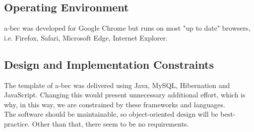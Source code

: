 \subsection{Operating Environment}
	a-bec was developed for Google Chrome but runs on most "up to date" browsers, i.e. Firefox, Safari, Microsoft Edge, Internet Explorer.
	
\subsection{Design and Implementation Constraints}
	The template of a-bec was delivered using Java, MySQL, Hibernation and JavaScript. Changing this would 
	present unnecessary additional effort, which is why, in this way, we are constrained by these frameworks and languages.\\
	The software should be maintainable, so object-oriented design will be best-practice.
	Other than that, there seem to be no requirements.